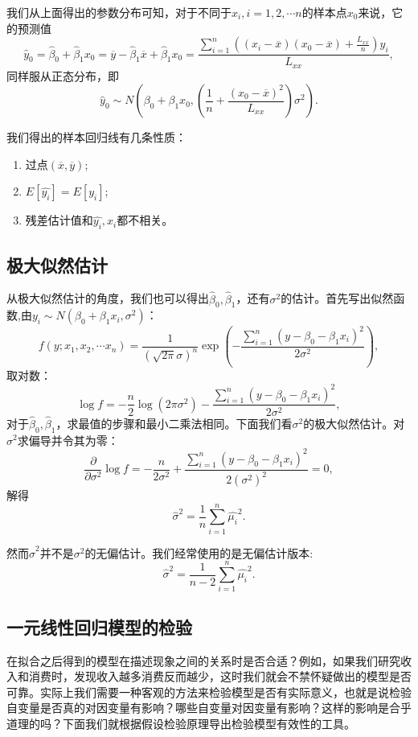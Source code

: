 \documentclass[lang=cn,10pt]{elegantbook}
\begin{document}
    \begin{note}
        我们从上面得出的参数分布可知，对于不同于\(x_i,i=1,2,\cdots n\)的样本点\(x_0\)来说，它的预测值
        \[\hat{y}_0=\hat{\beta}_0+\hat{\beta}_1x_0=\overline{y}-\hat{\beta}_1\overline{x}+\hat{\beta}_1x_0=\frac{\sum_{i=1}^{n}((x_i-\overline{x})(x_0-\overline{x})+\frac{L_{xx}}{n})y_i}{L_{xx}},\]
        同样服从正态分布，即
        \[\hat{y}_0\sim N(\beta_0+\beta_1x_0,(\frac{1}{n}+\frac{(x_0-\overline{x})^2}{L_{xx}})\sigma^2).\]
    \end{note}

        我们得出的样本回归线有几条性质：
    \begin{enumerate}
        \item 过点\((\overline{x},\overline{y})\);
        \item \(E[\hat{y_i}]=E[y_i]\);
        \item 残差估计值和\(\hat{y_i},x_i\)都不相关。
    \end{enumerate}

    \subsection{极大似然估计}
    从极大似然估计的角度，我们也可以得出\(\hat{\beta}_0,\hat{\beta}_1\)，还有\(\sigma^2\)的估计。首先写出似然函数,由\(y_i\sim N(\beta_0+\beta_1 x_i,\sigma^2)\)：
    \[f(y;x_1,x_2,\cdots x_n)=\frac{1}{(\sqrt{2\pi}\sigma)^n}\exp{(-\frac{\sum_{i=1}^{n}(y-\beta_0-\beta_1 x_i)^2}{2\sigma^2})},\]
    取对数：
    \[\log{f}=-\frac{n}{2}\log{(2\pi\sigma^2)}-\frac{\sum_{i=1}^{n}(y-\beta_0-\beta_1 x_i)^2}{2\sigma^2},\]
    对于\(\hat{\beta}_0,\hat{\beta}_1\)，求最值的步骤和最小二乘法相同。下面我们看\(\sigma^2\)的极大似然估计。对\(\sigma^2\)求偏导并令其为零：
    \[\frac{\partial}{\partial \sigma^2}\log{f}=-\frac{n}{2\sigma^2}+\frac{\sum_{i=1}^{n}(y-\beta_0-\beta_1 x_i)^2}{2(\sigma^2)^2}=0,\]
    解得
    \[\hat{\sigma}^2=\frac{1}{n}\sum_{i=1}^{n}\hat{\mu_i}^2.\]

    然而\(\hat{\sigma}^2\)并不是\(\sigma^2\)的无偏估计。我们经常使用的是无偏估计版本:
    \[\hat{\sigma}^2=\frac{1}{n-2}\sum_{i=1}^{n}\hat{\mu_i}^2.\]

    
    \subsection{一元线性回归模型的检验}
    在拟合之后得到的模型在描述现象之间的关系时是否合适？例如，如果我们研究收入和消费时，发现收入越多消费反而越少，这时我们就会不禁怀疑做出的模型是否可靠。实际上我们需要一种客观的方法来检验模型是否有实际意义，也就是说检验自变量是否真的对因变量有影响？哪些自变量对因变量有影响？这样的影响是合乎道理的吗？下面我们就根据假设检验原理导出检验模型有效性的工具。
\end{document}
